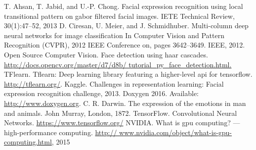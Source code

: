 \begin{thebibliography}{9}
	\bibitem{}T. Ahsan, T. Jabid, and U.-P. Chong. Facial expression recognition using local transitional pattern on gabor filtered facial images. IETE Technical Review, 30(1):47–52, 2013
	\bibitem{}D. Ciresan, U. Meier, and J. Schmidhuber. Multi-column deep neural networks for image classification In Computer Vision and Pattern Recognition (CVPR), 2012 IEEE Conference on, pages 3642–3649. IEEE, 2012.
	\bibitem{}Open Source Computer Vision. Face detection using haar cascades. \url{http://docs.opencv.org/master/d7/d8b/ tutorial_py_face_detection.html.}
	\bibitem{}TFlearn. Tﬂearn: Deep learning library featuring a higher-level api for tensorﬂow. \url{http://tflearn.org/}.
	\bibitem{}Kaggle. Challenges in representation learning: Facial expression recognition challenge, 2013.
	\bibitem{}Doxygen 2016. Available: \url{http://www.doxygen.org}.
	\bibitem{}C. R. Darwin. The expression of the emotions in man and animals. John Murray, London, 1872.
	\bibitem{}TensorFlow. Convolutional Neural Networks. \url{https://www.tensorflow.org/} 
	\bibitem{}NVIDIA. What is gpu computing? — high-performance computing. \url{http:// www.nvidia.com/object/what-is-gpu-computing.html}, 2015
\end{thebibliography}